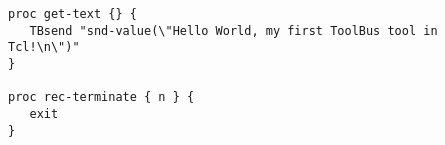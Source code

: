 \begin{verbatim}
proc get-text {} {
   TBsend "snd-value(\"Hello World, my first ToolBus tool in Tcl!\n\")"
}

proc rec-terminate { n } {
   exit
}
\end{verbatim}
